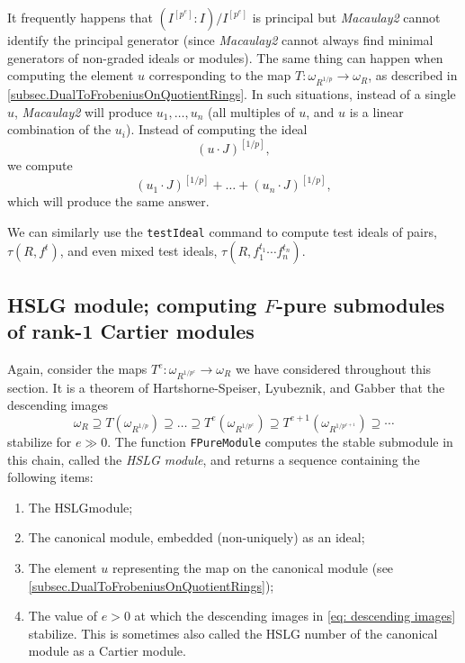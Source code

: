 \documentclass{amsart}
\begin{document}
\begin{remark}
   It frequently happens that $(I^{[p^e]} : I)/I^{[p^e]}$ is principal but \emph{Macaulay2} cannot identify the principal generator (since \emph{Macaulay2} cannot always find minimal generators of non-graded ideals or modules).
   The same thing can happen when computing the element $u$ corresponding to the map $T : \omega_{R^{1/p}} \to \omega_R$, as described in \autoref{subsec.DualToFrobeniusOnQuotientRings}.
   In such situations, instead of a single $u$, \emph{Macaulay2} will produce $u_1, \dots, u_n$ (all multiples of $u$, and $u$ is a linear combination of the $u_i$).  Instead of computing the ideal
\[
(u \cdot J)^{[1/p]},
\]
we compute
\[
(u_1 \cdot J)^{[1/p]} + \dots + (u_n \cdot J)^{[1/p]},
\]
which will produce the same answer.
\end{remark}

We can similarly use the \texttt{testIdeal} command to compute test ideals of pairs, $\tau(R, f^t)$, and even mixed test ideals, $\tau(R, f_1^{t_1} \cdots f_n^{t_n})$.

\subsection{HSLG module; computing $F$-pure submodules of rank-1 Cartier modules}

Again, consider the maps $T^e : \omega_{R^{1/p^e}} \to \omega_R$ we have considered throughout this section.  It is a theorem of Hartshorne-Speiser, Lyubeznik, and Gabber \cite{HartshorneSpeiserLocalCohomologyInCharacteristicP,LyubeznikFModulesApplicationsToLocalCohomology,Gabber.tStruc} that the descending images
\begin{equation}\label{eq: descending images}
\omega_R \supseteq T(\omega_{R^{1/p}}) \supseteq \dots \supseteq T^e(\omega_{R^{1/p^e}}) \supseteq T^{e+1}(\omega_{R^{1/p^{e+1}}}) \supseteq \cdots
\end{equation}
stabilize for $e \gg 0$.
The function \texttt{FPureModule} computes the stable submodule in this chain, called the \emph{HSLG module}, and returns a sequence containing the following items:
\begin{enumerate}[(1)]
   \item The HSLGmodule;
   \item The canonical module, embedded (non-uniquely) as an ideal;
   \item The element $u$ representing the map on the canonical module (see
   \autoref{subsec.DualToFrobeniusOnQuotientRings});
   \item The value of $e > 0$ at which the descending images in \eqref{eq: descending images} stabilize.  This is sometimes also called the HSLG number of the canonical module as a Cartier module.
\end{enumerate}
\end{document}
